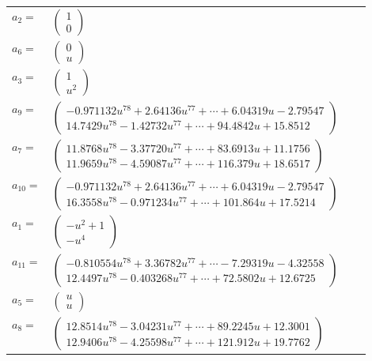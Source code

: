 \documentclass[1p]{elsarticle_modified}
\theoremstyle{definition}
\begin{document}
\begin{tabular}{m{7pt} m{180pt} m{7pt} m{180pt} }
\flushright $a_{2}=$&$\begin{pmatrix}1\\0\end{pmatrix}$ \\
\flushright $a_{6}=$&$\begin{pmatrix}0\\u\end{pmatrix}$ \\
\flushright $a_{3}=$&$\begin{pmatrix}1\\u^2\end{pmatrix}$ \\
\flushright $a_{9}=$&$\begin{pmatrix}-0.971132 u^{78}+2.64136 u^{77}+\cdots+6.04319 u-2.79547\\14.7429 u^{78}-1.42732 u^{77}+\cdots+94.4842 u+15.8512\end{pmatrix}$ \\
\flushright $a_{7}=$&$\begin{pmatrix}11.8768 u^{78}-3.37720 u^{77}+\cdots+83.6913 u+11.1756\\11.9659 u^{78}-4.59087 u^{77}+\cdots+116.379 u+18.6517\end{pmatrix}$ \\
\flushright $a_{10}=$&$\begin{pmatrix}-0.971132 u^{78}+2.64136 u^{77}+\cdots+6.04319 u-2.79547\\16.3558 u^{78}-0.971234 u^{77}+\cdots+101.864 u+17.5214\end{pmatrix}$ \\
\flushright $a_{1}=$&$\begin{pmatrix}- u^2+1\\- u^4\end{pmatrix}$ \\
\flushright $a_{11}=$&$\begin{pmatrix}-0.810554 u^{78}+3.36782 u^{77}+\cdots-7.29319 u-4.32558\\12.4497 u^{78}-0.403268 u^{77}+\cdots+72.5802 u+12.6725\end{pmatrix}$ \\
\flushright $a_{5}=$&$\begin{pmatrix}u\\u\end{pmatrix}$ \\
\flushright $a_{8}=$&$\begin{pmatrix}12.8514 u^{78}-3.04231 u^{77}+\cdots+89.2245 u+12.3001\\12.9406 u^{78}-4.25598 u^{77}+\cdots+121.912 u+19.7762\end{pmatrix}$ \\

\end{tabular}
\end{document}
